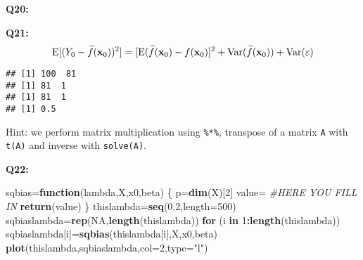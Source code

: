 \documentclass[]{article}
\newenvironment{Shaded}{\begin{snugshade}}{\end{snugshade}}
\newcommand{\KeywordTok}[1]{\textcolor[rgb]{0.13,0.29,0.53}{\textbf{#1}}}
\newcommand{\DataTypeTok}[1]{\textcolor[rgb]{0.13,0.29,0.53}{#1}}
\newcommand{\DecValTok}[1]{\textcolor[rgb]{0.00,0.00,0.81}{#1}}
\newcommand{\StringTok}[1]{\textcolor[rgb]{0.31,0.60,0.02}{#1}}
\newcommand{\CommentTok}[1]{\textcolor[rgb]{0.56,0.35,0.01}{\textit{#1}}}
\newcommand{\OtherTok}[1]{\textcolor[rgb]{0.56,0.35,0.01}{#1}}
\newcommand{\ControlFlowTok}[1]{\textcolor[rgb]{0.13,0.29,0.53}{\textbf{#1}}}
\newcommand{\OperatorTok}[1]{\textcolor[rgb]{0.81,0.36,0.00}{\textbf{#1}}}
\newcommand{\NormalTok}[1]{#1}
\begin{document}
\textbf{Q20:}

\textbf{Q21:}
\[\text{E}[(Y_0-\widetilde{f}({\bf x}_0))^2]=[\text{E}(\widetilde{f}({\bf x}_0)-f({\bf x}_0)]^2+\text{Var}(\widetilde{f}({\bf x}_0) ) + \text{Var}(\varepsilon)\]

\begin{Shaded}
\end{Shaded}

\begin{verbatim}
## [1] 100  81
## [1] 81  1
## [1] 81  1
## [1] 0.5
\end{verbatim}

Hint: we perform matrix multiplication using \texttt{\%*\%}, transpose
of a matrix \texttt{A} with \texttt{t(A)} and inverse with
\texttt{solve(A)}.

\textbf{Q22:}

\begin{Shaded}
\begin{Highlighting}[]
\NormalTok{sqbias=}\ControlFlowTok{function}\NormalTok{(lambda,X,x0,beta)}
\NormalTok{\{}
\NormalTok{  p=}\KeywordTok{dim}\NormalTok{(X)[}\DecValTok{2}\NormalTok{]}
\NormalTok{  value=}\StringTok{ }\CommentTok{#HERE YOU FILL IN}
\StringTok{  }\KeywordTok{return}\NormalTok{(value)}
\NormalTok{\}}
\NormalTok{thislambda=}\KeywordTok{seq}\NormalTok{(}\DecValTok{0}\NormalTok{,}\DecValTok{2}\NormalTok{,}\DataTypeTok{length=}\DecValTok{500}\NormalTok{)}
\NormalTok{sqbiaslambda=}\KeywordTok{rep}\NormalTok{(}\OtherTok{NA}\NormalTok{,}\KeywordTok{length}\NormalTok{(thislambda))}
\ControlFlowTok{for}\NormalTok{ (i }\ControlFlowTok{in} \DecValTok{1}\OperatorTok{:}\KeywordTok{length}\NormalTok{(thislambda)) sqbiaslambda[i]=}\KeywordTok{sqbias}\NormalTok{(thislambda[i],X,x0,beta)}
\KeywordTok{plot}\NormalTok{(thislambda,sqbiaslambda,}\DataTypeTok{col=}\DecValTok{2}\NormalTok{,}\DataTypeTok{type=}\StringTok{"l"}\NormalTok{)}
\end{Highlighting}
\end{Shaded}
\end{document}
